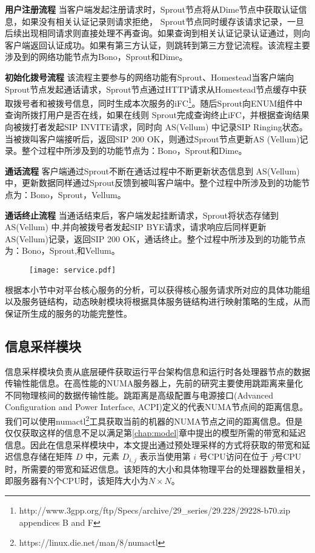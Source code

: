 \textbf{用户注册流程}{ }当客户端发起注册请求时，Sprout节点将从Dime节点中获取认证信息，如果没有相关认证记录则请求拒绝， Sprout节点同时缓存该请求记录，一旦后续出现相同请求则直接处理不再查询。如果查询到相关认证记录认证通过，则向客户端返回认证成功。如果有第三方认证，则跳转到第三方登记流程。该流程主要涉及到的网络功能节点为Bono，Sprout和Dime。

\textbf{初始化拨号流程}{ }该流程主要参与的网络功能有Sprout、Homestead当客户端向Sprout节点发起通话请求，Sprout节点通过HTTP请求从Homestead节点缓存中获取拨号者和被拨号信息，同时生成本次服务的iFC\footnote{http://www.3gpp.org/ftp/Specs/archive/29\_series/29.228/29228-b70.zip appendices B and F}。随后Sprout向ENUM组件中查询所拨打用户是否在线，如果在线则 Sprout完成查询终止iFC，并根据查询结果向被拨打者发起SIP INVITE请求，同时向 AS(Vellum) 中记录SIP Ringing状态。当被拨叫客户端接听后，返回SIP 200 OK，则通过Sprout节点更新AS (Vellum)记录。整个过程中所涉及到的功能节点为：Bono，Sprout和Dime。

\textbf{通话流程}{ }客户端通过Sprout不断在通话过程中不断更新状态信息到 AS(Vellum) 中，更新数据同样通过Sprout反馈到被叫客户端中。整个过程中所涉及到的功能节点为：Bono，Sprout，Vellum。

\textbf{通话终止流程}{ }当通话结束后，客户端发起挂断请求，Sprout将状态存储到 AS(Vellum) 中,并向被拨号者发起SIP BYE请求，请求响应后同样更新 AS(Vellum)记录，返回SIP 200 OK，通话终止。整个过程中所涉及到的功能节点为：Bono，Sprout,和Vellum。

\begin{figure}[!htp]
	\centering
	\texttt{[image: service.pdf]}
\end{figure}

根据本小节中对平台核心服务的分析，可以获得核心服务请求所对应的具体功能组以及服务链结构，动态映射模块将根据具体服务链结构进行映射策略的生成，从而保证所生成的服务的功能完整性。

\subsection{信息采样模块}
\label{imp:sample}

信息采样模块负责从底层硬件获取运行平台架构信息和运行时各处理器节点的数据传输性能信息。在高性能的NUMA服务器上，先前的研究主要使用跳距离来量化不同物理核间的数据传输性能。跳距离是高级配置与电源接口(Advanced Configuration and Power Interface, ACPI)定义的代表NUMA节点间的距离信息。我们可以使用numactl\footnote{https://linux.die.net/man/8/numactl}工具获取当前的机器的NUMA节点之间的距离信息。但是仅仅获取这样的信息不足以满足第\ref{chap:model}章中提出的模型所需的带宽和延迟信息。因此在信息采样模块中，本文提出通过预处理采样的方式将获取的带宽和延迟信息存储在矩阵 $D$ 中，元素 $D_{i,j}$ 表示当使用第 $i$ 号CPU访问在位于 $j$号CPU时，所需要的带宽和延迟信息。该矩阵的大小和具体物理平台的处理器数量相关，即服务器有N个CPU时，该矩阵大小为$N\times N$。

